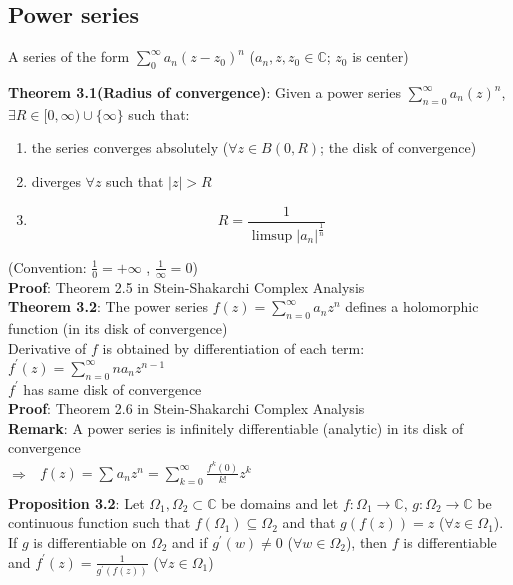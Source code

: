 \documentclass{article}
\begin{document}
\begin{flushleft}
\subsection{\textbf{Power series}} 

A series of the form $\sum_{0}^{\infty} a_n(z-z_0)^n$ ($a_n,z,z_0\in \mathds{C}$; $z_0$ is center)

\textbf{Theorem 3.1(Radius of convergence)}: Given a power series $\sum_{n=0}^{\infty} a_n(z)^n$,\\
$\exists R\in [0,\infty) \cup \{\infty\}$ such that:
\begin{enumerate}
\item the series converges absolutely ($\forall z\in B(0,R)$; the disk of convergence)
\item diverges $\forall z$ such that $|z|>R$ 
\item \begin{equation} R=\frac{1}{\limsup |a_n|^{\frac{1}{n}}}\nonumber \end{equation}
\end{enumerate}
(Convention: $\frac{1}{0}=+\infty$ , $\frac{1}{\infty}=0$)\\
\textbf{Proof}: Theorem 2.5 in Stein-Shakarchi Complex Analysis\\
\vspace{2mm}
\textbf{Theorem 3.2}: The power series $f(z)=\sum_{n=0}^{\infty} a_nz^n$ defines a holomorphic function (in its disk of convergence)\\
Derivative of $f$ is obtained by differentiation of each term:\\
$f^{'}(z)=\sum_{n=0}^{\infty} na_nz^{n-1}$ \\
$f^{'}$ has same disk of convergence\\
\textbf{Proof}: Theorem 2.6 in Stein-Shakarchi Complex Analysis\\
\textbf{Remark}: A power series is infinitely differentiable (analytic) in its disk of convergence\\  
$\Rightarrow$ \hspace{40mm}$ \begin{aligned} f(z)=\sum_{}^{}a_nz^n =\sum_{k=0}^{\infty} \frac{f^{k}(0)}{k!} z^k \nonumber\\ \end{aligned}$
\\
\vspace{3mm}
\textbf{Proposition 3.2}: Let $\Omega_1,\Omega_2 \subset \mathds{C}$ be domains and let $f:\Omega_1\rightarrow \mathds{C}$,
$g:\Omega_2\rightarrow \mathds{C}$ be continuous function such that $f(\Omega_1)\subseteq \Omega_2$ and that $g(f(z))=z$ ($\forall z\in \Omega_1$).
If $g$ is differentiable on $\Omega_2$ and if $g^{'}(w)\neq 0$ ($\forall w \in \Omega_2$), then $f$ is differentiable and $f^{'}(z)=\frac{1}{g^{'}(f(z))}$ ($\forall z\in \Omega_1$)


\end{flushleft}
\end{document}
